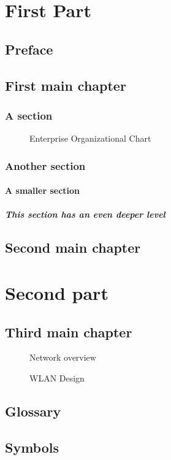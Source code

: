 \documentclass{book}
\begin{document}
\tableofcontents
\listoffigures
\part{First Part}
\chapter*{Preface}
\chapter{First main chapter}
\section{A section}
\begin{figure}
\centering
{}
\caption{Enterprise Organizational Chart}
\end{figure}
\section{Another section}
\subsection{A smaller section}
\subsubsection[Deeper level]{This section has an even deeper
level}
\chapter{Second main chapter}
\part{Second part}
\chapter{Third main chapter}
\begin{figure}
\centering
{}
\caption{Network overview}
\end{figure}
\begin{figure}
\centering
{}
\caption{WLAN Design}
\end{figure}
\appendix
\cleardoublepage
{}
\chapter{Glossary}
\chapter{Symbols}
\clearpage
{}
\printindex
\end{document}
